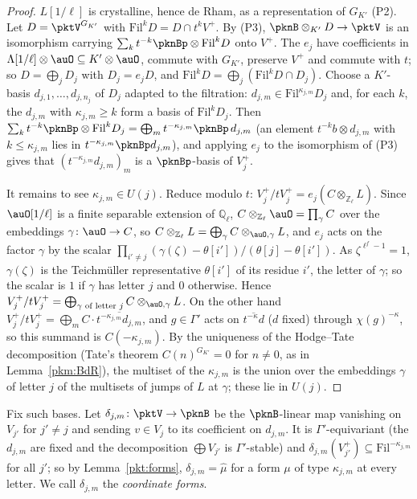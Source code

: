 \documentclass[10pt]{amsart}
\theoremstyle{definition}
\theoremstyle{remark}
\newcommand{\Z}{\mathbb Z}
\newcommand{\Q}{\mathbb Q}
\begin{document}
\begin{proof}
$L[1/\ell]$ is crystalline, hence de Rham, as a representation of $G_{K'}$ (P2). Let
$D=\pktV^{G_{K'}}$ with $\mathrm{Fil}^kD=D\cap t^kV^+$. By (P3), $\pknB\otimes_{K'}D\to\pktV$ is an
isomorphism carrying $\sum_kt^{-k}\pknBp\otimes\mathrm{Fil}^kD$ onto $V^+$. The $e_j$ have coefficients in
$\Lambda[1/\ell]\otimes\auO\subseteq K'\otimes\auO$, commute with $G_{K'}$, preserve $V^+$ and commute with
$t$; so $D=\bigoplus_jD_j$ with $D_j=e_jD$, and $\mathrm{Fil}^kD=\bigoplus_j(\mathrm{Fil}^kD\cap D_j)$.
Choose a $K'$-basis $d_{j,1},\dots,d_{j,n_j}$ of $D_j$ adapted to the filtration: $d_{j,m}\in
\mathrm{Fil}^{\kappa_{j,m}}D_j$ and, for each $k$, the $d_{j,m}$ with $\kappa_{j,m}\ge k$ form a basis of
$\mathrm{Fil}^kD_j$. Then $\sum_kt^{-k}\pknBp\otimes\mathrm{Fil}^kD_j=\bigoplus_mt^{-\kappa_{j,m}}\pknBp\,
d_{j,m}$ (an element $t^{-k}b\otimes d_{j,m}$ with $k\le\kappa_{j,m}$ lies in $t^{-\kappa_{j,m}}\pknBp
d_{j,m}$), and applying $e_j$ to the isomorphism of (P3) gives that $(t^{-\kappa_{j,m}}d_{j,m})_m$ is a
$\pknBp$-basis of $V_j^+$.

It remains to see $\kappa_{j,m}\in U(j)$. Reduce modulo $t$: $V_j^+/tV_j^+=e_j(C\otimes_{\Z_\ell}L)$. Since
$\auO[1/\ell]$ is a finite separable extension of $\Q_\ell$, $C\otimes_{\Z_\ell}\auO=\prod_\gamma C$ over the
embeddings $\gamma\colon\auO\to C$, so $C\otimes_{\Z_\ell}L=\bigoplus_\gamma C\otimes_{\auO,\gamma}L$, and
$e_j$ acts on the factor $\gamma$ by the scalar $\prod_{i'\ne j}(\gamma(\zeta)-\theta[i'])/(\theta[j]-
\theta[i'])$. As $\zeta^{\ell^f-1}=1$, $\gamma(\zeta)$ is the Teichm\"uller representative $\theta[i']$ of
its residue $i'$, the letter of $\gamma$; so the scalar is $1$ if $\gamma$ has letter $j$ and $0$
otherwise. Hence $V_j^+/tV_j^+=\bigoplus_{\gamma\text{ of letter }j}C\otimes_{\auO,\gamma}L$. On the
other hand $V_j^+/tV_j^+=\bigoplus_mC\cdot\overline{t^{-\kappa_{j,m}}d_{j,m}}$, and $g\in\Gamma'$ acts on
$\overline{t^{-\kappa}d}$ ($d$ fixed) through $\chi(g)^{-\kappa}$, so this summand is $C(-\kappa_{j,m})$. By
the uniqueness of the Hodge--Tate decomposition (Tate's theorem $C(n)^{G_{K'}}=0$ for $n\ne0$, as in
Lemma~\ref{pkm:BdR}), the multiset of the $\kappa_{j,m}$ is the union over the embeddings $\gamma$ of letter
$j$ of the multisets of jumps of $L$ at $\gamma$; these lie in $U(j)$.
\end{proof}

Fix such bases. Let $\delta_{j,m}\colon\pktV\to\pknB$ be the $\pknB$-linear map vanishing on $V_{j'}$
for $j'\ne j$ and sending $v\in V_j$ to its coefficient on $d_{j,m}$. It is $\Gamma'$-equivariant (the
$d_{j,m}$ are fixed and the decomposition $\bigoplus V_{j'}$ is $\Gamma'$-stable) and $\delta_{j,m}(V_{j'}^+)
\subseteq\mathrm{Fil}^{-\kappa_{j,m}}$ for all $j'$; so by Lemma~\ref{pkt:forms}, $\delta_{j,m}=\hat\mu$ for a
form $\mu$ of type $\kappa_{j,m}$ at every letter. We call $\delta_{j,m}$ the \emph{coordinate forms}.
\end{document}
